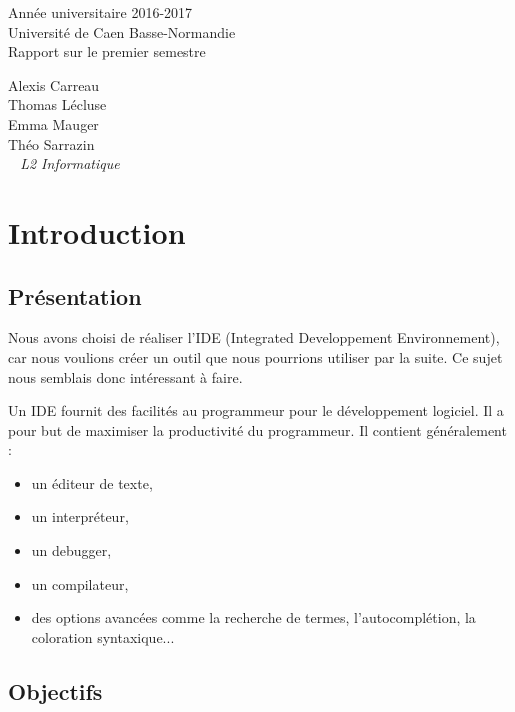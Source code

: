 \documentclass[a4paper,12pt]{article}
\begin{document}
\begin{titlepage}
	\begin{center}
		\Large{Année universitaire 2016-2017}\\
		\Large{Université de Caen Basse-Normandie}\\[1cm]
		
		\huge{Rapport sur le premier semestre}\\
		\vspace{3cm}
		
		Alexis Carreau\\
		Thomas Lécluse\\
		Emma Mauger\\
		Théo Sarrazin\\
		
	\normalsize{\textit{ ~ L2 Informatique}}\\
		\medskip
		\vspace{2cm}
		
	\end{center}
\end{titlepage}

\tableofcontents
\newpage

\section{Introduction}

	\subsection{Présentation}
	Nous avons choisi de réaliser l'IDE (Integrated Developpement Environnement), car nous voulions créer un outil que nous pourrions utiliser par la suite. Ce sujet nous semblais donc intéressant à faire.
	
	Un IDE fournit des facilités au programmeur pour le développement logiciel. Il a pour but de maximiser la productivité du programmeur. Il contient généralement :
	\begin{itemize}
		\item un éditeur de texte, 
		\item un interpréteur, 
		\item un debugger,
		\item un compilateur,
		\item des options avancées comme la recherche de termes, l'autocomplétion, la coloration syntaxique...
	\end{itemize}
	
	\subsection{Objectifs}
	
\end{document}
